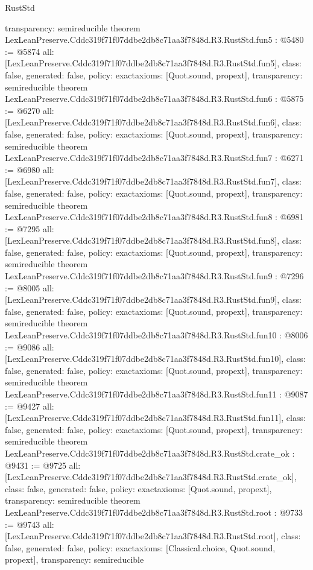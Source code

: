 \begin{lexlean}{RustStd}
\begin{coremodule}
{  transparency: semireducible
}
theorem LexLeanPreserve.Cddc319f71f07ddbe2db8c71aa3f7848d.R3.RustStd.fun5 : @5480 := @5874 {
  all: [LexLeanPreserve.Cddc319f71f07ddbe2db8c71aa3f7848d.R3.RustStd.fun5],
  class: false,
  generated: false,
  policy: exact{axioms: [Quot.sound, propext]},
  transparency: semireducible
}
theorem LexLeanPreserve.Cddc319f71f07ddbe2db8c71aa3f7848d.R3.RustStd.fun6 : @5875 := @6270 {
  all: [LexLeanPreserve.Cddc319f71f07ddbe2db8c71aa3f7848d.R3.RustStd.fun6],
  class: false,
  generated: false,
  policy: exact{axioms: [Quot.sound, propext]},
  transparency: semireducible
}
theorem LexLeanPreserve.Cddc319f71f07ddbe2db8c71aa3f7848d.R3.RustStd.fun7 : @6271 := @6980 {
  all: [LexLeanPreserve.Cddc319f71f07ddbe2db8c71aa3f7848d.R3.RustStd.fun7],
  class: false,
  generated: false,
  policy: exact{axioms: [Quot.sound, propext]},
  transparency: semireducible
}
theorem LexLeanPreserve.Cddc319f71f07ddbe2db8c71aa3f7848d.R3.RustStd.fun8 : @6981 := @7295 {
  all: [LexLeanPreserve.Cddc319f71f07ddbe2db8c71aa3f7848d.R3.RustStd.fun8],
  class: false,
  generated: false,
  policy: exact{axioms: [Quot.sound, propext]},
  transparency: semireducible
}
theorem LexLeanPreserve.Cddc319f71f07ddbe2db8c71aa3f7848d.R3.RustStd.fun9 : @7296 := @8005 {
  all: [LexLeanPreserve.Cddc319f71f07ddbe2db8c71aa3f7848d.R3.RustStd.fun9],
  class: false,
  generated: false,
  policy: exact{axioms: [Quot.sound, propext]},
  transparency: semireducible
}
theorem LexLeanPreserve.Cddc319f71f07ddbe2db8c71aa3f7848d.R3.RustStd.fun10 : @8006 := @9086 {
  all: [LexLeanPreserve.Cddc319f71f07ddbe2db8c71aa3f7848d.R3.RustStd.fun10],
  class: false,
  generated: false,
  policy: exact{axioms: [Quot.sound, propext]},
  transparency: semireducible
}
theorem LexLeanPreserve.Cddc319f71f07ddbe2db8c71aa3f7848d.R3.RustStd.fun11 : @9087 := @9427 {
  all: [LexLeanPreserve.Cddc319f71f07ddbe2db8c71aa3f7848d.R3.RustStd.fun11],
  class: false,
  generated: false,
  policy: exact{axioms: [Quot.sound, propext]},
  transparency: semireducible
}
theorem LexLeanPreserve.Cddc319f71f07ddbe2db8c71aa3f7848d.R3.RustStd.crate_ok : @9431 := @9725 {
  all: [LexLeanPreserve.Cddc319f71f07ddbe2db8c71aa3f7848d.R3.RustStd.crate_ok],
  class: false,
  generated: false,
  policy: exact{axioms: [Quot.sound, propext]},
  transparency: semireducible
}
theorem LexLeanPreserve.Cddc319f71f07ddbe2db8c71aa3f7848d.R3.RustStd.root : @9733 := @9743 {
  all: [LexLeanPreserve.Cddc319f71f07ddbe2db8c71aa3f7848d.R3.RustStd.root],
  class: false,
  generated: false,
  policy: exact{axioms: [Classical.choice, Quot.sound, propext]},
  transparency: semireducible
}


\end{coremodule}
\end{lexlean}
